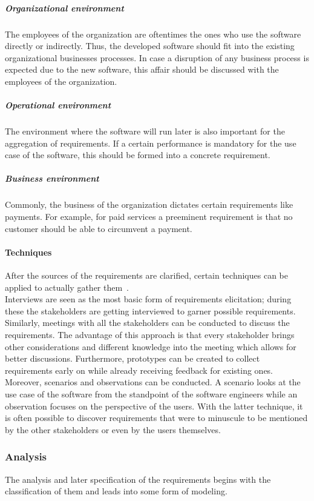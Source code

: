 \documentclass[12pt,a4paper,twoside]{report}
\begin{document}
\subparagraph{Organizational environment}
The employees of the organization are oftentimes the ones who use the software
directly or indirectly. Thus, the developed software should fit into the existing
organizational businesses processes. In case a disruption of any business process
is expected due to the new software, this affair should be discussed with the
employees of the organization.

\subparagraph{Operational environment}
The environment where the software will run later is also important for the
aggregation of requirements. If a certain performance is mandatory for the use case
of the software, this should be formed into a concrete requirement.

\subparagraph{Business environment}
Commonly, the business of the organization dictates certain requirements like
payments. For example, for paid services a preeminent requirement is that
no customer should be able to circumvent a payment.


\paragraph{Techniques}
After the sources of the requirements are clarified, certain techniques can be
applied to actually gather them~\cite{sommerville-se, swebok}.\\
Interviews are seen as the most basic form of requirements elicitation;
during these the stakeholders are getting interviewed to garner possible requirements.
Similarly, meetings with all the stakeholders can be conducted to discuss the requirements.
The advantage of this approach is that every stakeholder brings other considerations and
different knowledge into the meeting which allows for better discussions.
Furthermore, prototypes can be created to collect requirements early on while already
receiving feedback for existing ones. Moreover, scenarios and observations can be
conducted. A scenario looks at the use case of the software from the standpoint
of the software engineers while an observation focuses on the perspective of the
users. With the latter technique, it is often possible to discover requirements
that were to minuscule to be mentioned by the other stakeholders or even by the users themselves.


\subsubsection{Analysis}

The analysis and later specification of the requirements begins with the classification
of them and leads into some form of modeling.
\end{document}
